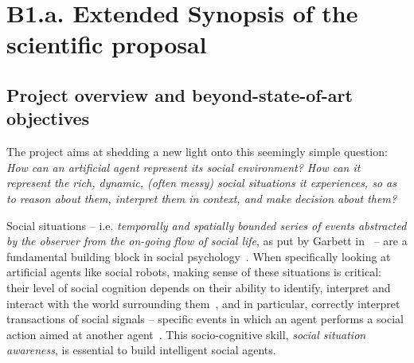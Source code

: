 
\newrefsection


\chapter{B1.a. Extended Synopsis of the scientific proposal}\label{part1}




\section{Project overview and beyond-state-of-art objectives}

The \project project aims at shedding a new light onto this seemingly simple
question: \emph{How can an artificial agent represent its social environment?
How can it represent the rich, dynamic, (often messy) social situations it
experiences, so as to reason about them, interpret them in context, and make
decision about them?}

Social situations -- i.e. \emph{temporally and spatially bounded series of
events abstracted by the observer from the on-going flow of social life}, as put
by Garbett in~\cite{garbett1970analysis} -- are a fundamental building block in
social psychology~\cite{argyle1981social}. When specifically looking at
artificial agents like social robots, making sense of these situations is
critical: their level of social cognition depends on their ability to identify,
interpret and interact with the world surrounding
them~\cite{szczepanowski2017computational}, and in particular, correctly
interpret transactions of social signals -- specific events in which an agent
performs a social action aimed at another agent~\cite{pantic2011social}. This
socio-cognitive skill, \emph{social situation awareness}, is essential to build
intelligent social agents.

